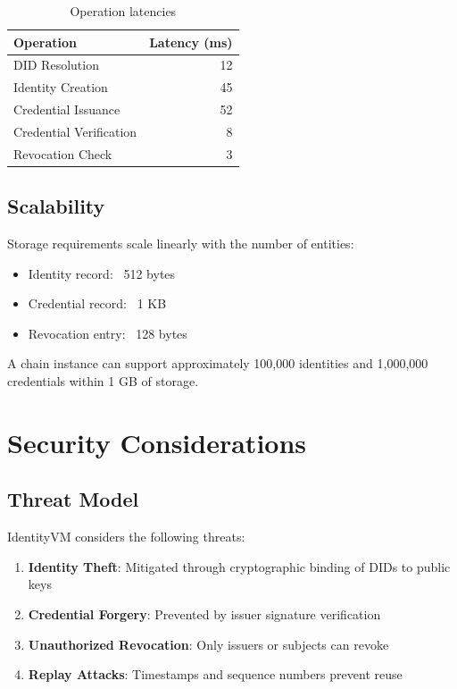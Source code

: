 \documentclass[11pt,twocolumn]{article}
\begin{document}
\begin{table}[h]
\centering
\begin{tabular}{|l|r|}
\hline
\textbf{Operation} & \textbf{Latency (ms)} \\
\hline
DID Resolution & 12 \\
Identity Creation & 45 \\
Credential Issuance & 52 \\
Credential Verification & 8 \\
Revocation Check & 3 \\
\hline
\end{tabular}
\caption{Operation latencies}
\end{table}

\subsection{Scalability}

Storage requirements scale linearly with the number of entities:

\begin{itemize}
\item Identity record: ~512 bytes
\item Credential record: ~1 KB
\item Revocation entry: ~128 bytes
\end{itemize}

A chain instance can support approximately 100,000 identities and 1,000,000 credentials within 1 GB of storage.

\section{Security Considerations}

\subsection{Threat Model}

IdentityVM considers the following threats:

\begin{enumerate}
\item \textbf{Identity Theft}: Mitigated through cryptographic binding of DIDs to public keys
\item \textbf{Credential Forgery}: Prevented by issuer signature verification
\item \textbf{Unauthorized Revocation}: Only issuers or subjects can revoke
\item \textbf{Replay Attacks}: Timestamps and sequence numbers prevent reuse
\end{enumerate}
\end{document}
